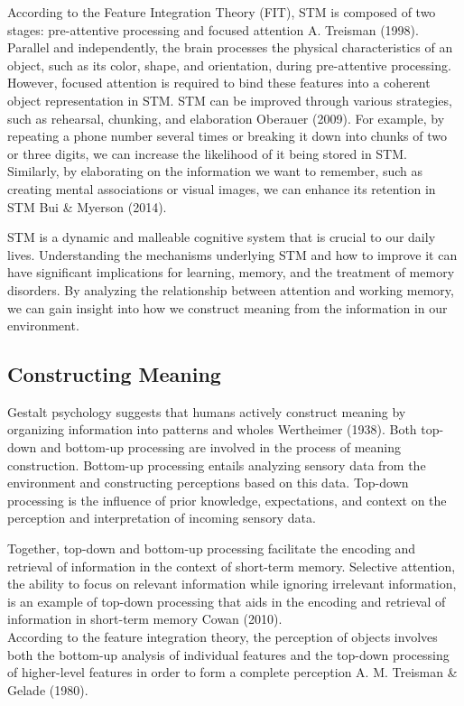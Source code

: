 \documentclass[print]{nuthesis}
\begin{document}
According to the Feature Integration Theory (FIT), STM is composed of two stages: pre-attentive processing and focused attention A. Treisman (1998).
Parallel and independently, the brain processes the physical characteristics of an object, such as its color, shape, and orientation, during pre-attentive processing.
However, focused attention is required to bind these features into a coherent object representation in STM.
STM can be improved through various strategies, such as rehearsal, chunking, and elaboration Oberauer (2009).
For example, by repeating a phone number several times or breaking it down into chunks of two or three digits, we can increase the likelihood of it being stored in STM.
Similarly, by elaborating on the information we want to remember, such as creating mental associations or visual images, we can enhance its retention in STM Bui \& Myerson (2014).

STM is a dynamic and malleable cognitive system that is crucial to our daily lives.
Understanding the mechanisms underlying STM and how to improve it can have significant implications for learning, memory, and the treatment of memory disorders.
By analyzing the relationship between attention and working memory, we can gain insight into how we construct meaning from the information in our environment.

\hypertarget{constructing-meaning}{%
\subsection{Constructing Meaning}\label{constructing-meaning}}

Gestalt psychology suggests that humans actively construct meaning by organizing information into patterns and wholes Wertheimer (1938).
Both top-down and bottom-up processing are involved in the process of meaning construction.
Bottom-up processing entails analyzing sensory data from the environment and constructing perceptions based on this data.
Top-down processing is the influence of prior knowledge, expectations, and context on the perception and interpretation of incoming sensory data.

Together, top-down and bottom-up processing facilitate the encoding and retrieval of information in the context of short-term memory.
Selective attention, the ability to focus on relevant information while ignoring irrelevant information, is an example of top-down processing that aids in the encoding and retrieval of information in short-term memory Cowan (2010).\\
According to the feature integration theory, the perception of objects involves both the bottom-up analysis of individual features and the top-down processing of higher-level features in order to form a complete perception A. M. Treisman \& Gelade (1980).
\end{document}
